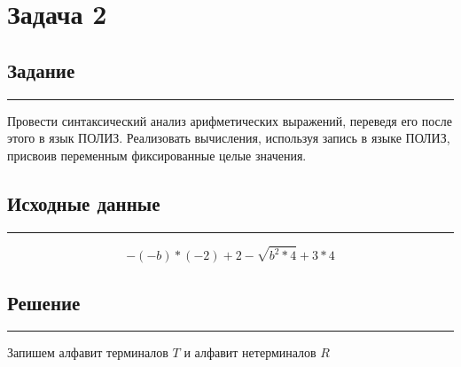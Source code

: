 \documentclass[a4paper, 14pt]{extarticle}
\begin{document}
\section*{Задача 2}

\subsection*{Задание}\vspace{-20pt}\rule{\linewidth}{0.1mm}

Провести синтаксический анализ арифметических выражений, переведя его
после этого в язык ПОЛИЗ. Реализовать вычисления, используя запись в
языке ПОЛИЗ, присвоив переменным фиксированные целые значения.

\subsection*{Исходные данные}\vspace{-20pt}\rule{\linewidth}{0.1mm}

\begin{equation*}
       -(-b) * (-2) + 2 - \sqrt{b^2 * 4} + 3 * 4
\end{equation*}

\subsection*{Решение}\vspace{-20pt}\rule{\linewidth}{0.1mm}

\vspace{10pt}

Запишем алфавит терминалов $T$ и алфавит нетерминалов $R$

\vspace{-5pt}
\end{document}
